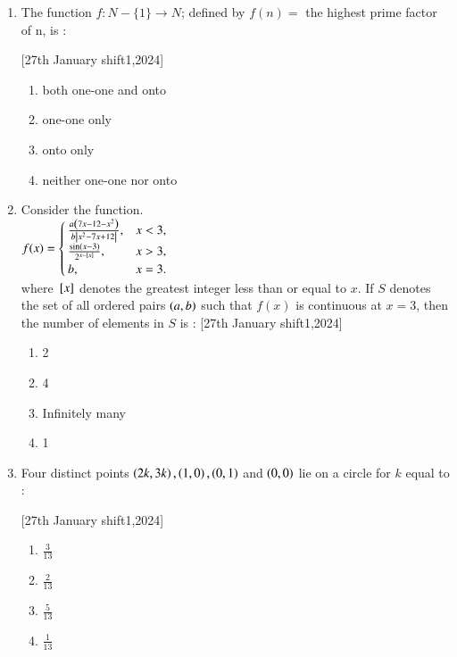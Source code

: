 \documentclass[journal]{IEEEtran}
\begin{document}
\begin{enumerate}[start=16]
\item The function $f  : N-{\{1}\}\rightarrow N$; defined by $f(n)=$ the highest prime factor of n, is :    
    
    \hfill{[27th January shift1,2024]}
\begin{enumerate}
    \item both one-one and onto
    \item one-one only
    \item onto only
    \item neither one-one nor onto
\end{enumerate}

\item Consider the function.\\
$f(x)= \begin{cases} 
\frac{a \left(7x - 12 - x^2\right)}{b\left\vert x^2 - 7x + 12\right\vert}, & x < 3, \\
\frac{\sin(x - 3)}{2^{x - {}\left[x\right]}}, & x > 3, \\
b, & x = 3.
\end{cases}
$\\
where ${}\left[x\right]$ denotes the greatest integer less than or equal to $x$. If $S$ denotes the set of all ordered pairs $\left(a,b\right)$ such that $f(x)$ is continuous at $x=3$, then the number of elements in $S$ is : \hfill{[27th January shift1,2024]}
\begin{enumerate}
    \item 2
    \item 4
    \item Infinitely many
    \item 1
\end{enumerate}

\item Four distinct points $\left(2k,3k\right), \left(1,0\right), \left(0,1\right)$ and $\left(0,0\right)$ lie on a circle for $k$ equal to :

    \hfill{[27th January shift1,2024]}
\begin{enumerate}
    \item $\frac{3}{13}$\\
    \item $\frac{2}{13}$\\
    \item $\frac{5}{13}$\\
    \item $\frac{1}{13}$
\end{enumerate}


\end{enumerate}
\end{document}
